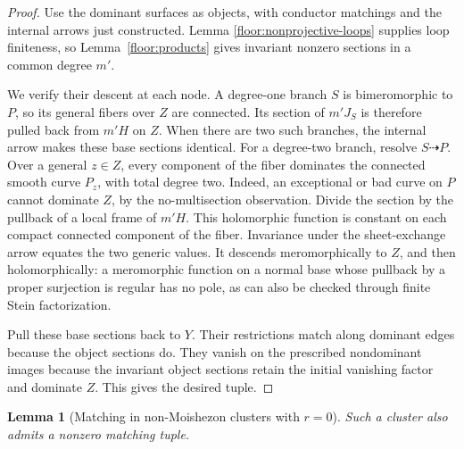 \documentclass[11pt,letterpaper]{article}
\newtheorem{lemma}[theorem]{Lemma}
\theoremstyle{definition}
\theoremstyle{remark}
\begin{document}
\begin{proof}
Use the dominant surfaces as objects, with conductor matchings
and the internal arrows just constructed.  Lemma
\ref{floor:nonprojective-loops} supplies loop finiteness, so
Lemma~\ref{floor:products} gives invariant nonzero sections
in a common degree $m'$.

We verify their descent at each node.  A degree-one branch
$S$ is bimeromorphic to $P$, so its general fibers over $Z$
are connected.  Its section of $m'J_S$ is therefore pulled
back from $m'H$ on $Z$.  When there are two such branches,
the internal arrow makes these base sections identical.
For a degree-two branch, resolve $S\dashrightarrow P$.
Over a general $z\in Z$, every component of the fiber
dominates the connected smooth curve $P_z$, with total
degree two.  Indeed, an exceptional or bad curve on $P$
cannot dominate $Z$, by the no-multisection observation.
Divide the section by the pullback of a local frame of
$m'H$.  This holomorphic function is constant on each
compact connected component of the fiber.  Invariance under
the sheet-exchange arrow equates the two generic values.
It descends meromorphically to $Z$, and then holomorphically:
a meromorphic function on a normal base whose pullback by a
proper surjection is regular has no pole, as can also be
checked through finite Stein factorization.

Pull these base sections back to $Y$.  Their restrictions
match along dominant edges because the object sections do.
They vanish on the prescribed nondominant images because
the invariant object sections retain the initial vanishing
factor and dominate $Z$.  This gives the desired tuple.
\end{proof}

\begin{lemma}[Matching in non-Moishezon clusters with $r=0$]
\label{floor:nonprojective-r0}
Such a cluster also admits a nonzero matching tuple.
\end{lemma}
\end{document}
